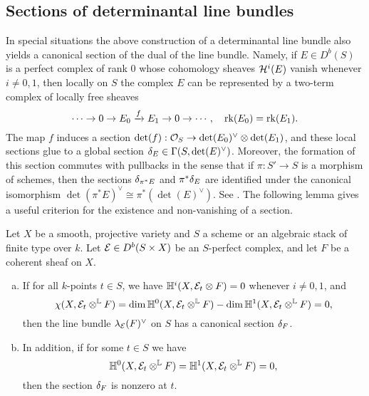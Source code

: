 \subsection{Sections of determinantal line bundles}
In special situations the above construction of a determinantal line bundle also yields a canonical section of the dual of the line bundle. Namely, if $E \in D^b(S)$ is a perfect complex of rank 0 whose cohomology sheaves $\mathcal{H}^i(E)$ vanish whenever $i \neq 0, 1$, then locally on $S$ the complex $E$ can be represented by a two-term complex of locally free sheaves
\[ \cdots \to 0 \to E_0 \xrightarrow{f} E_1 \to 0 \to \cdots, \quad \operatorname{\mathrm{rk}}(E_0) = \operatorname{\mathrm{rk}}(E_1). \]
The map $f$ induces a section $\det(f): \mathcal{O}_S \to \det(E_0)^\vee \otimes \det(E_1)$, and these local sections glue to a global section $\delta_E \in \Gamma(S, \det(E)^\vee)$. Moreover, the formation of this section commutes with pullbacks in the sense that if $\pi: S' \to S$ is a morphism of schemes, then the sections $\delta_{\pi^*E}$ and $\pi^*\delta_E$ are identified under the canonical isomorphism $\det(\pi^* E)^\vee \cong \pi^*(\det(E)^\vee)$. See \cite[\href{https://stacks.math.columbia.edu/tag/0FJX}{Tag 0FJX}]{stacks-project}. The following lemma gives a useful criterion for the existence and non-vanishing of a section.
\begin{lem}\label{detsection}
    Let $X$ be a smooth, projective variety and $S$ a scheme or an algebraic stack of finite type over $k$. Let $\mathcal{E} \in D^b(S \times X)$ be an $S$-perfect complex, and let $F$ be a coherent sheaf on $X$.
    \begin{enumerate}[(a)]
        \item If for all $k$-points $t \in S$, we have $\mathbb{H}^i(X, \mathcal{E}_t \otimes F) = 0$ whenever $i \neq 0, 1$, and 
        \[ \chi(X, \mathcal{E}_t \otimes^{\mathbb{L}} F) = \dim \mathbb{H}^0(X, \mathcal{E}_t \otimes^{\mathbb{L}} F) - \dim \mathbb{H}^1(X, \mathcal{E}_t \otimes^{\mathbb{L}} F) = 0, \]
        then the line bundle $\lambda_{\mathcal{E}}(F)^\vee$ on $S$ has a canonical section $\delta_F$.
        \item In addition, if for some $t \in S$ we have 
        \[ \mathbb{H}^0(X, \mathcal{E}_t \otimes^{\mathbb{L}} F) = \mathbb{H}^1(X, \mathcal{E}_t \otimes^{\mathbb{L}} F) = 0, \]
        then the section $\delta_F$ is nonzero at $t$.
    \end{enumerate}
\end{lem}
